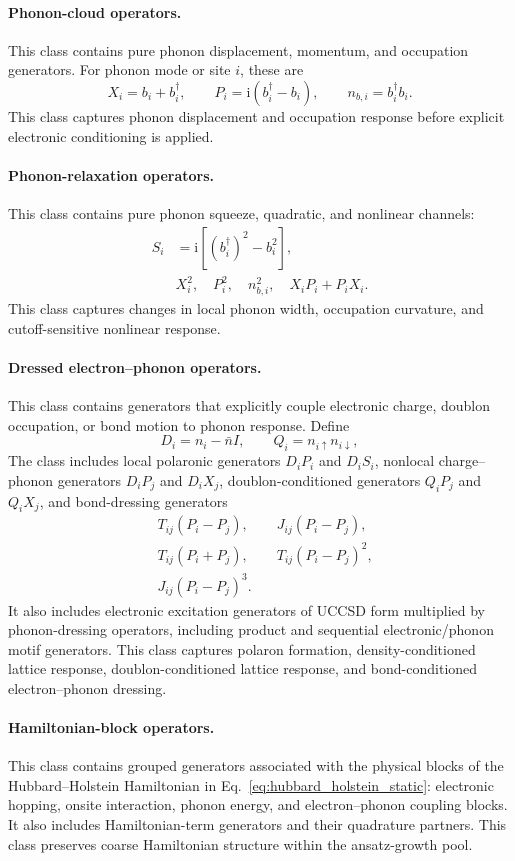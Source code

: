 \documentclass[
  reprint,
  amsmath,
  amssymb,
  aps,
  pra,
  nofootinbib,
  superscriptaddress,
  floatfix
]{revtex4-2}
\newcommand{\ii}{\mathrm{i}}
\begin{document}
\paragraph*{Phonon-cloud operators.}
This class contains pure phonon displacement, momentum, and occupation generators. For phonon mode or site \(i\), these are
\[
X_i=b_i+b_i^\dagger,
\qquad
P_i=\ii(b_i^\dagger-b_i),
\qquad
n_{b,i}=b_i^\dagger b_i .
\]
This class captures phonon displacement and occupation response before
explicit electronic conditioning is applied.

\paragraph*{Phonon-relaxation operators.}
This class contains pure phonon squeeze, quadratic, and nonlinear
channels:
\begin{align*}
S_i&=\ii[(b_i^\dagger)^2-b_i^2],\\
&X_i^2,\quad P_i^2,\quad n_{b,i}^2,\quad
X_iP_i+P_iX_i .
\end{align*}
This class captures changes in local phonon width, occupation curvature, and
cutoff-sensitive nonlinear response.

\paragraph*{Dressed electron--phonon operators.}
This class contains generators that explicitly couple electronic charge, doublon occupation, or bond motion to phonon response. Define
\[
D_i=n_i-\bar n I,
\qquad
Q_i=n_{i\uparrow}n_{i\downarrow},
\]
The class includes local polaronic generators \(D_iP_i\) and \(D_iS_i\), nonlocal charge--phonon generators \(D_iP_j\) and \(D_iX_j\), doublon-conditioned generators \(Q_iP_j\) and \(Q_iX_j\), and bond-dressing generators
\begin{align*}
&T_{ij}(P_i-P_j),
\qquad
J_{ij}(P_i-P_j),\\
&T_{ij}(P_i+P_j),
\qquad
T_{ij}(P_i-P_j)^2,\\
&J_{ij}(P_i-P_j)^3 .
\end{align*}
It also includes electronic excitation generators of UCCSD form multiplied by phonon-dressing
operators, including product and sequential electronic/phonon motif generators.
This class captures polaron formation, density-conditioned lattice response,
doublon-conditioned lattice response, and bond-conditioned electron--phonon
dressing.

\paragraph*{Hamiltonian-block operators.}
This class contains grouped generators associated with the physical blocks of the Hubbard--Holstein Hamiltonian
in Eq.~\eqref{eq:hubbard_holstein_static}: electronic hopping, onsite
interaction, phonon energy, and electron--phonon coupling blocks. It also
includes Hamiltonian-term generators and their quadrature partners. This class
preserves coarse Hamiltonian structure within the ansatz-growth pool.
\end{document}
